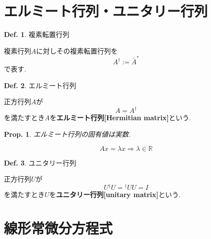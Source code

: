 \documentclass[a4paper,10pt,report]{amsart}
\theoremstyle{plain}
\newtheorem{prop}{Prop.}[section]
\theoremstyle{definition}
\newtheorem{defn}{Def.}[section]
\theoremstyle{remark}
\begin{document}
\part{エルミート行列・ユニタリー行列}
\begin{leftbar}
    \begin{defn}複素転置行列\par
        複素行列\(A \)に対しその複素転置行列を
        \begin{equation}
            A^{\dagger}:=\bar{A}^{*}
        \end{equation}
        で表す. 
    \end{defn}
\end{leftbar}
\begin{leftbar}
    \begin{defn}エルミート行列\par
        正方行列\(A\)が
        \begin{equation}
            A=A^{\dagger}
        \end{equation}
        を満たすとき\(A\)を\textbf{エルミート行列[Hermitian matrix]}という. 
    \end{defn}
\end{leftbar}
\begin{leftbar}
    \begin{prop}エルミート行列の固有値は実数. \par
        \begin{equation}
            Ax=\lambda x\Rightarrow \lambda\in\mathbb{R}
        \end{equation}
    \end{prop}
\end{leftbar}
\begin{leftbar}
    \begin{defn}ユニタリー行列\par
        正方行列\(U\)が
        \begin{equation}
            U{}^{\dagger}U={}^{\dagger}UU=I
        \end{equation}
        を満たすとき\(U\)を\textbf{ユニタリー行列[unitary matrix]}という. 
    \end{defn}
\end{leftbar}
\part{線形常微分方程式}
\end{document}
